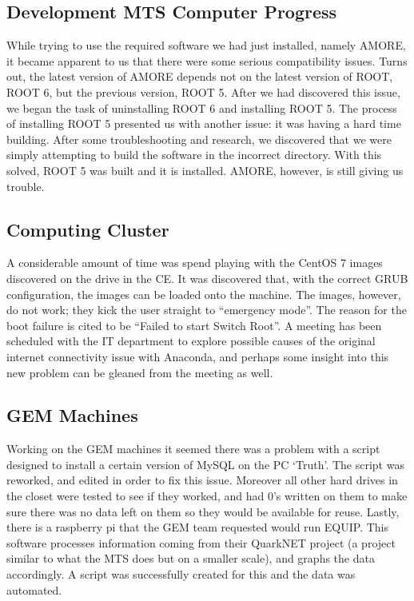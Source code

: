 \documentclass[12pt]{article}
\newcommand\tab[1][1cm]{\hspace*{#1}}
\begin{document}
\subsection{Development MTS Computer Progress}

\tab While trying to use the required software we had just installed, namely
AMORE, it became apparent to us that there were some serious compatibility
issues. Turns out, the latest version of AMORE depends not on the latest version
of ROOT, ROOT 6, but the previous version, ROOT 5. After we had discovered this
issue, we began the task of uninstalling ROOT 6 and installing ROOT 5. The
process of installing ROOT 5 presented us with another issue: it was having a
hard time building. After some troubleshooting and research, we discovered that
we were simply attempting to build the software in the incorrect directory. With
this solved, ROOT 5 was built and it is installed. AMORE, however, is still
giving us trouble.

\subsection{Computing Cluster}

\tab A considerable amount of time was spend playing with the CentOS 7 images
discovered on the drive in the CE. It was discovered that, with the correct GRUB
configuration, the images can be loaded onto the machine. The images, however,
do not work; they kick the user straight to ``emergency mode''. The reason for
the boot failure is cited to be ``Failed to start Switch Root''. A meeting has
been scheduled with the IT department to explore possible causes of the original
internet connectivity issue with Anaconda, and perhaps some insight into this
new problem can be gleaned from the meeting as well.

\subsection{GEM Machines}
\tab Working on the GEM machines it seemed there was a problem with a script designed to install a certain version of MySQL on the PC `Truth'. The script was reworked, and edited in order to fix this issue. Moreover all other hard drives in the closet were tested to see if they worked, and had 0's written on them to make sure there was no data left on them so they would be available for reuse. Lastly, there is a raspberry pi that the GEM team requested would run EQUIP. This software processes information coming from their QuarkNET project (a project similar to what the MTS does but on a smaller scale), and graphs the data accordingly. A script was successfully created for this and the data was automated.
\end{document}
